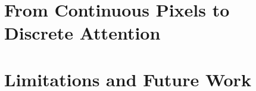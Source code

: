 \documentclass[letterpaper]{article} %
\begin{document}
\section{From Continuous Pixels to Discrete Attention}


\section{Limitations and Future Work}
\end{document}
